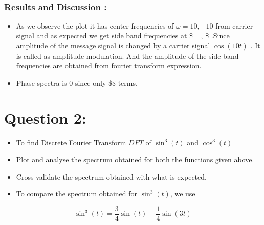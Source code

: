 \documentclass[11pt]{article}
\providecommand{\tightlist}{%
      \setlength{\itemsep}{0pt}\setlength{\parskip}{0pt}}
\begin{document}
	

    \begin{center}
    \end{center}
    { \hspace*{\fill} \\}
    
	
		
    \subsubsection{Results and Discussion :}\label{results-and-discussion}

\begin{itemize}
\tightlist
\item
  As we observe the plot it has center frequencies of
  \(\omega = 10,-10\) from carrier signal and as expected we get side
  band frequencies at \$\omega =  ,  \$ .Since amplitude of
  the message signal is changed by a carrier signal \(\cos(10t)\) . It
  is called as amplitude modulation. And the amplitude of the side band
  frequencies are obtained from fourier transform expression.
\item
  Phase spectra is 0 since only \$\cos \$ terms.
\end{itemize}

	

	
		
    \section{Question 2:}\label{question-2}

\begin{itemize}
\tightlist
\item
  To find Discrete Fourier Transform \(DFT\) of \(\sin ^{3}(t)\) and
  \(\cos^{3}(t)\)
\item
  Plot and analyse the spectrum obtained for both the functions given
  above.
\item
  Cross validate the spectrum obtained with what is expected.
\item
  To compare the spectrum obtained for \(\sin^{3}(t)\), we use
\end{itemize}

\begin{equation}
\sin^{3}(t) = \frac{3}{4}\sin(t) - \frac{1}{4}\sin(3t)
\end{equation}
\end{document}
